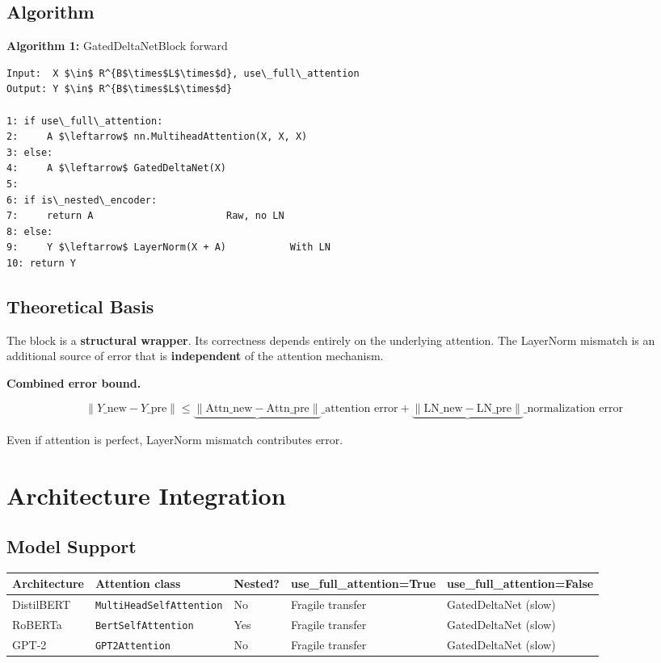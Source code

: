 \subsection{Algorithm}

\textbf{Algorithm 1:} GatedDeltaNetBlock forward
\begin{lstlisting}
Input:  X $\in$ R^{B$\times$L$\times$d}, use\_full\_attention
Output: Y $\in$ R^{B$\times$L$\times$d}

1: if use\_full\_attention:
2:     A $\leftarrow$ nn.MultiheadAttention(X, X, X)
3: else:
4:     A $\leftarrow$ GatedDeltaNet(X)
5:
6: if is\_nested\_encoder:
7:     return A                       Raw, no LN
8: else:
9:     Y $\leftarrow$ LayerNorm(X + A)           With LN
10: return Y
\end{lstlisting}

\subsection{Theoretical Basis}

The block is a \textbf{structural wrapper}. Its correctness depends entirely on 
the underlying attention. The LayerNorm mismatch is an additional source 
of error that is \textbf{independent} of the attention mechanism.

\textbf{Combined error bound.}

\[
\|Y\_\text{new} - Y\_\text{pre}\| \leq \underbrace{\|\text{Attn}\_\text{new} - \text{Attn}\_\text{pre}\|}\_{\text{attention error}} + \underbrace{\|\text{LN}\_\text{new} - \text{LN}\_\text{pre}\|}\_{\text{normalization error}}
\tag{4.2}
\]

Even if attention is perfect, LayerNorm mismatch contributes error.




\section{Architecture Integration}

\subsection{Model Support}

\begin{table}[H]
\centering
\small
\begin{tabular}{lllll}
\toprule
\textbf{Architecture} & \textbf{Attention class} & \textbf{Nested?} & \textbf{use\_full\_attention=True} & \textbf{use\_full\_attention=False} \\
\midrule
DistilBERT & \texttt{MultiHeadSelfAttention} & No & Fragile transfer & GatedDeltaNet (slow) \\
RoBERTa & \texttt{BertSelfAttention} & Yes & Fragile transfer & GatedDeltaNet (slow) \\
GPT-2 & \texttt{GPT2Attention} & No & Fragile transfer & GatedDeltaNet (slow) \\
\bottomrule
\end{tabular}
\end{table}

